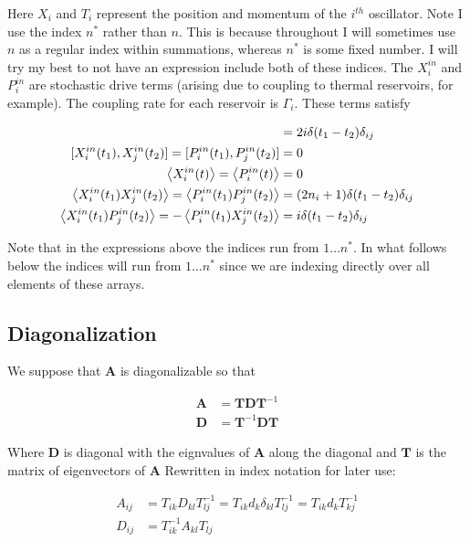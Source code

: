 \documentclass[12pt]{article}
\newcommand{\bv}[1]{\boldsymbol{#1}}
\begin{document}
Here $X_i$ and $T_i$ represent the position and momentum of the $i^{th}$ oscillator. Note I use the index $n^*$ rather than $n$. This is because throughout I will sometimes use $n$ as a regular index within summations, whereas $n^*$ is some fixed number. I will try my best to not have an expression include both of these indices.
The $X_i^{in}$ and $P_i^{in}$ are stochastic drive terms (arising due to coupling to thermal reservoirs, for example). The coupling rate for each reservoir is $\Gamma_i$. These terms satisfy

\begin{align}
[X_i^{in}(t_1),P_j^{in}(t_2)] &= 2i\delta(t_1-t_2)\delta_{ij}\\
[X_i^{in}(t_1),X_j^{in}(t_2)] = [P_i^{in}(t_1),P_j^{in}(t_2)] &= 0\\
\Braket{X_{i}^{in}(t)} = \Braket{P_i^{in}(t)} &= 0\\
\Braket{X_i^{in}(t_1)X_j^{in}(t_2)} = \Braket{P_i^{in}(t_1)P_j^{in}(t_2)} &= (2n_i+1)\delta(t_1-t_2)\delta_{ij}\\
\Braket{X_i^{in}(t_1)P_j^{in}(t_2)} = -\Braket{P_i^{in}(t_1)X_j^{in}(t_2)} &= i\delta(t_1-t_2)\delta_{ij}
\end{align}

Note that in the expressions above the indices run from $1\ldots n^*$. In what follows below the indices will run from $1\ldots n^*$ since we are indexing directly over all elements of these arrays.

\subsection{Diagonalization}

We suppose that $\bv{A}$ is diagonalizable so that

\begin{align}
\bv{A} &= \bv{T}\bv{D}\bv{T}^{-1}\\
\bv{D} &= \bv{T}^{-1}\bv{D}\bv{T}
\end{align}

Where $\bv{D}$ is diagonal with the eignvalues of $\bv{A}$ along the diagonal and $\bv{T}$ is the matrix of eigenvectors of $\bv{A}$
Rewritten in index notation for later use:

\begin{align}
A_{ij} &= T_{ik}D_{kl}T^{-1}_{lj} = T_{ik}d_k\delta_{kl}T^{-1}_{lj} = T_{ik}d_k T^{-1}_{kj}\\
D_{ij} &= T^{-1}_{ik}A_{kl}T_{lj}
\end{align}
\end{document}
